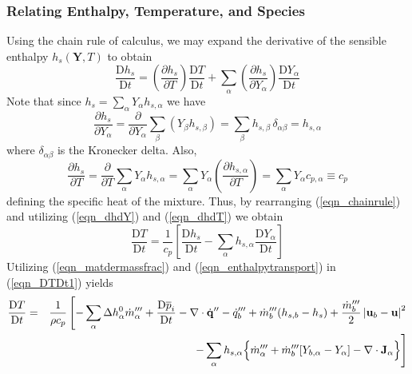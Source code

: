 \subsubsection{Relating Enthalpy, Temperature, and Species}
\label{eqn_enthalpy_temperature}

Using the chain rule of calculus, we may expand the derivative of the sensible enthalpy $h_s(\mathbf{Y},T)$ to obtain
\begin{equation}
\label{eqn_chainrule}
\frac{\mbox{D} h_s}{\mbox{D} t} = \left(\frac{\partial h_s}{\partial T}\right) \frac{\mbox{D} T }{\mbox{D} t} +
\sum_\alpha \left( \frac{\partial h_s}{\partial Y_\alpha} \right) \frac{\mbox{D} Y_\alpha }{\mbox{D} t}
\end{equation}
Note that since $h_s = \sum_\alpha Y_\alpha h_{s,\alpha}$ we have
\begin{equation}
\label{eqn_dhdY}
\frac{\partial h_s}{\partial Y_\alpha} = \frac{\partial}{\partial Y_\alpha} \sum_\beta (Y_\beta h_{s,\beta} )
= \sum_\beta h_{s,\beta} \,\delta_{\alpha \beta} = h_{s,\alpha}
\end{equation}
where $\delta_{\alpha \beta}$ is the Kronecker delta. Also,
\begin{equation}
\label{eqn_dhdT}
\frac{\partial h_s}{\partial T} = \frac{\partial}{\partial T} \sum_\alpha Y_\alpha h_{s,\alpha} =
\sum_\alpha Y_\alpha \left(\frac{\partial h_{s,\alpha}}{\partial T}\right) = \sum_\alpha Y_\alpha c_{p,\alpha} \equiv c_p
\end{equation}
defining the specific heat of the mixture.  Thus, by rearranging (\ref{eqn_chainrule}) and utilizing (\ref{eqn_dhdY}) and (\ref{eqn_dhdT}) we obtain
\begin{equation}
\label{eqn_DTDt1}
\frac{\mbox{D} T}{\mbox{D} t} = \frac{1}{c_p} \left[ \frac{\mbox{D} h_s}{\mbox{D} t} - \sum_\alpha h_{s,\alpha} \frac{\mbox{D} Y_\alpha}{\mbox{D} t} \right]
\end{equation}
Utilizing (\ref{eqn_matdermassfrac}) and (\ref{eqn_enthalpytransport}) in (\ref{eqn_DTDt1}) yields
\begin{eqnarray}
\frac{\mbox{D} T}{\mbox{D} t} &=& \frac{1}{\rho c_p}   \left[  -\sum_\alpha \Delta h^0_\alpha \dot{m}_{\alpha}^{\tripleprime} + \frac{\mbox{D} \overline{p}_i }{\mbox{D} t} - \Div\dot{\mathbf{q}}^{\prime\prime} - \dq_b''' + \dot{m}_{b}^{\tripleprime} ( h_{s,b} - h_s )  + \frac{\dot{m}_{b}^{\tripleprime}}{2}\left|\mathbf{u}_b-\mathbf{u}\right|^2\right.   \nonumber \vspace{0.3cm} \\
& &  \quad\quad\,\, \left. - \sum_\alpha h_{s,\alpha} \Big\{  \dot{m}_\alpha^{\tripleprime} + \dot{m}_{b}^{\tripleprime}[Y_{b,\alpha} - Y_\alpha] - \Div \mathbf{J}_{\alpha} \Big\}  \right]
\label{eqn_DTDt2}
\end{eqnarray}
